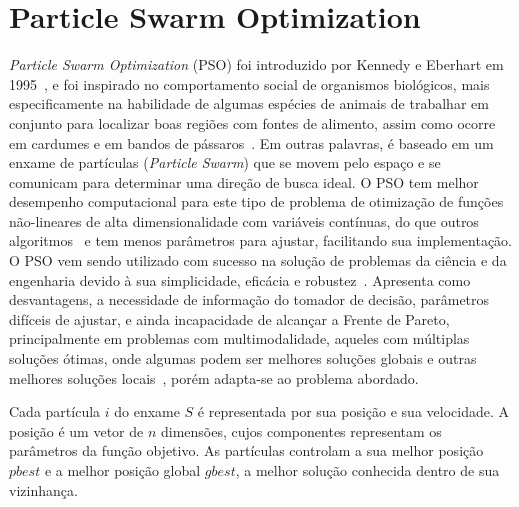 \documentclass[sigconf]{acmart}
\begin{document}
\section{Particle Swarm Optimization}
\label{sec:PSO}
\textit{Particle Swarm Optimization} (PSO) foi introduzido por Kennedy e Eberhart em 1995~\cite{eberhart1995}, e foi inspirado no comportamento social de organismos biológicos, mais especificamente na habilidade de algumas espécies de animais de trabalhar em conjunto para localizar boas regiões com fontes de alimento, assim como ocorre em cardumes e em bandos de pássaros~\cite{bratton2007}. Em outras palavras, é baseado em um enxame de partículas (\emph{Particle Swarm}) que se movem pelo espaço e se comunicam para determinar uma direção de busca ideal. O PSO tem melhor desempenho computacional para este tipo de problema de otimização de funções não-lineares de alta dimensionalidade com variáveis contínuas, do que outros algoritmos~\cite{eberhart1995,bratton2007,alrashidi2009} e tem menos parâmetros para ajustar, facilitando sua implementação. O PSO vem sendo utilizado com sucesso na solução de problemas da ciência e da engenharia devido à sua simplicidade, eficácia e robustez~\cite{fukuyama1999, ourique2002, sousa2004,van2006,engelbrecht2007, alrashidi2009,rodriguez2014,al2015}. Apresenta como desvantagens, a necessidade de informação do tomador de decisão, parâmetros difíceis de ajustar, e ainda incapacidade de alcançar a Frente de Pareto, principalmente em problemas com multimodalidade, aqueles com múltiplas soluções ótimas, onde algumas podem ser melhores soluções globais e outras melhores soluções locais~\cite{figueiredo2013}, porém adapta-se ao problema abordado.

Cada partícula $ i $ do enxame $ S $ é representada por sua posição e sua velocidade. A posição é um vetor de $ n $ dimensões, cujos componentes representam os parâmetros da função objetivo. As partículas controlam a sua melhor posição $ pbest $ e a melhor posição global $ gbest $, a melhor solução conhecida dentro de sua vizinhança.
\end{document}
